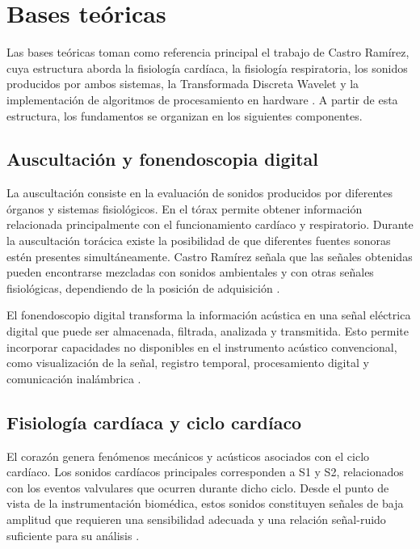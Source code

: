 \section{Bases teóricas}

Las bases teóricas toman como referencia principal el trabajo de Castro Ramírez, cuya estructura aborda la fisiología cardíaca, la fisiología respiratoria, los sonidos producidos por ambos sistemas, la Transformada Discreta Wavelet y la implementación de algoritmos de procesamiento en hardware . A partir de esta estructura, los fundamentos se organizan en los siguientes componentes.

\subsection{Auscultación y fonendoscopia digital}

La auscultación consiste en la evaluación de sonidos producidos por diferentes órganos y sistemas fisiológicos. En el tórax permite obtener información relacionada principalmente con el funcionamiento cardíaco y respiratorio. Durante la auscultación torácica existe la posibilidad de que diferentes fuentes sonoras estén presentes simultáneamente. Castro Ramírez señala que las señales obtenidas pueden encontrarse mezcladas con sonidos ambientales y con otras señales fisiológicas, dependiendo de la posición de adquisición .

El fonendoscopio digital transforma la información acústica en una señal eléctrica digital que puede ser almacenada, filtrada, analizada y transmitida. Esto permite incorporar capacidades no disponibles en el instrumento acústico convencional, como visualización de la señal, registro temporal, procesamiento digital y comunicación inalámbrica .

\subsection{Fisiología cardíaca y ciclo cardíaco}

El corazón genera fenómenos mecánicos y acústicos asociados con el ciclo cardíaco. Los sonidos cardíacos principales corresponden a S1 y S2, relacionados con los eventos valvulares que ocurren durante dicho ciclo. Desde el punto de vista de la instrumentación biomédica, estos sonidos constituyen señales de baja amplitud que requieren una sensibilidad adecuada y una relación señal-ruido suficiente para su análisis .

